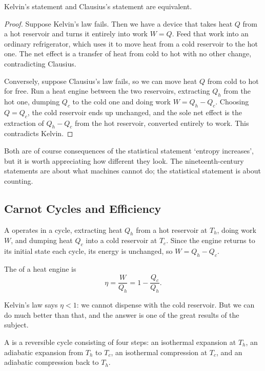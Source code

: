 \begin{proposition}
	Kelvin's statement and Clausius's statement are equivalent.
\end{proposition}
\begin{proof}
	Suppose Kelvin's law fails. Then we have a device that takes heat $Q$ from a hot reservoir and turns it entirely into work $W = Q$. Feed that work into an ordinary refrigerator, which uses it to move heat from a cold reservoir to the hot one. The net effect is a transfer of heat from cold to hot with no other change, contradicting Clausius.

	Conversely, suppose Clausius's law fails, so we can move heat $Q$ from cold to hot for free. Run a heat engine between the two reservoirs, extracting $Q_h$ from the hot one, dumping $Q_c$ to the cold one and doing work $W = Q_h - Q_c$. Choosing $Q = Q_c$, the cold reservoir ends up unchanged, and the sole net effect is the extraction of $Q_h - Q_c$ from the hot reservoir, converted entirely to work. This contradicts Kelvin.
\end{proof}

Both are of course consequences of the statistical statement `entropy increases', but it is worth appreciating how different they look. The nineteenth-century statements are about what machines cannot do; the statistical statement is about counting.

\subsection{Carnot Cycles and Efficiency}

A  operates in a cycle, extracting heat $Q_h$ from a hot reservoir at $T_h$, doing work $W$, and dumping heat $Q_c$ into a cold reservoir at $T_c$. Since the engine returns to its initial state each cycle, its energy is unchanged, so $W = Q_h - Q_c$.

\begin{definition}[Efficiency]
	The  of a heat engine is
	$$
	\eta = \frac{W}{Q_h} = 1 - \frac{Q_c}{Q_h}.
	$$
\end{definition}

Kelvin's law says $\eta < 1$: we cannot dispense with the cold reservoir. But we can do much better than that, and the answer is one of the great results of the subject.

\begin{definition}
	A  is a reversible cycle consisting of four steps: an isothermal expansion at $T_h$, an adiabatic expansion from $T_h$ to $T_c$, an isothermal compression at $T_c$, and an adiabatic compression back to $T_h$.
\end{definition}


